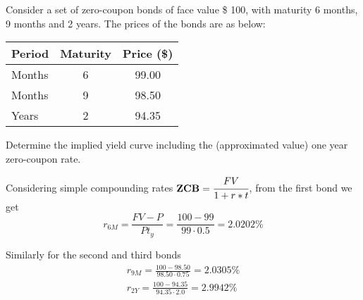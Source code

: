 \documentclass[12pt,a4paper]{exam}
\begin{document}
\begin{questions}
\question
Consider a set of zero-coupon bonds of face value \$ 100, with maturity 6 months, 9 months and 2 years. The prices of the bonds are as below:
\begin{table}[h]
  \begin{center}
    \begin{tabular}{|l|c|c|}
      \hline
      \textbf{Period} & \textbf{Maturity} & \textbf{Price (\$)} \\ \hline
      Months          & 6                 & 99.00               \\ \hline
      Months          & 9                 & 98.50               \\ \hline
      Years           & 2                 & 94.35               \\ \hline
    \end{tabular}
  \end{center}
\end{table}
Determine the implied yield curve including the (approximated value) one year zero-coupon rate.
\fillwithlines{3cm}
\begin{solution}
Considering simple compounding rates $\textbf{ZCB}=\cfrac{FV}{1+r*t}$, from the first bond we get
\begin{equation*}
  r_{6M} = \frac{FV-P}{Pt_y} = \frac{100 - 99}{99\cdot0.5} = 2.0202\% 
\end{equation*}

Similarly for the second and third bonds
\begin{equation*}
  \begin{gathered}
    r_{9M} = \frac{100 - 98.50}{98.50\cdot0.75} = 2.0305\% \\
    r_{2Y} = \frac{100 - 94.35}{94.35\cdot2.0} = 2.9942\%
 \end{gathered}   
\end{equation*}


\end{solution}
\end{questions}
\end{document}
